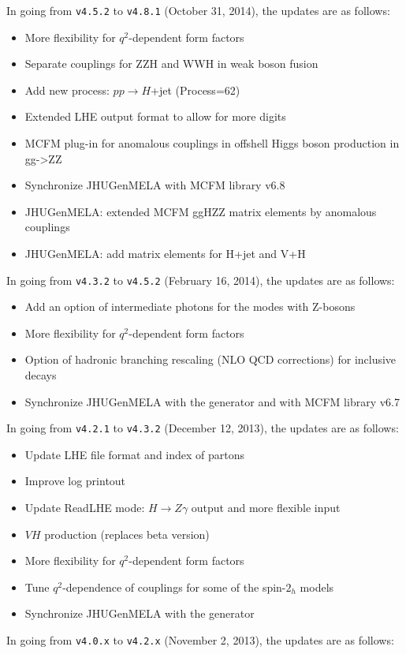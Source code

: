 \documentclass[aps,superscriptaddress,nofootinbib]{revtex4}
\begin{document}
\noindent
In going from \verb|v4.5.2| to \verb|v4.8.1| (October 31, 2014), the updates are as follows:
\begin{itemize}
\item More flexibility for $q^2$-dependent form factors
\item Separate couplings for ZZH and WWH in weak boson fusion
\item Add new process: $pp\to H$+jet (Process=62)
\item Extended LHE output format to allow for more digits
\item MCFM plug-in for anomalous couplings in offshell Higgs boson production in gg->ZZ
\item Synchronize JHUGenMELA with MCFM library v6.8
\item JHUGenMELA: extended MCFM ggHZZ matrix elements by anomalous couplings
\item JHUGenMELA: add matrix elements for H+jet and V+H
\end{itemize}
\noindent
In going from \verb|v4.3.2| to \verb|v4.5.2| (February 16, 2014), the updates are as follows:
\begin{itemize}
\item Add an option of intermediate photons for the modes with Z-bosons
\item More flexibility for $q^2$-dependent form factors
\item Option of hadronic branching rescaling (NLO QCD corrections) for inclusive decays
\item Synchronize JHUGenMELA with the generator and with MCFM library v6.7
\end{itemize}
\noindent
In going from \verb|v4.2.1| to \verb|v4.3.2| (December 12, 2013), the updates are as follows:
\begin{itemize}
\item Update LHE file format and index of partons
\item Improve log printout
\item Update ReadLHE mode: $H\to Z\gamma$ output and more flexible input
\item $VH$ production (replaces beta version)
\item More flexibility for $q^2$-dependent form factors
\item Tune $q^2$-dependence of couplings for some of the spin-$2_h$ models
\item Synchronize JHUGenMELA with the generator
\end{itemize}
\noindent
In going from \verb|v4.0.x| to \verb|v4.2.x| (November 2, 2013), the updates are as follows:
\end{document}
